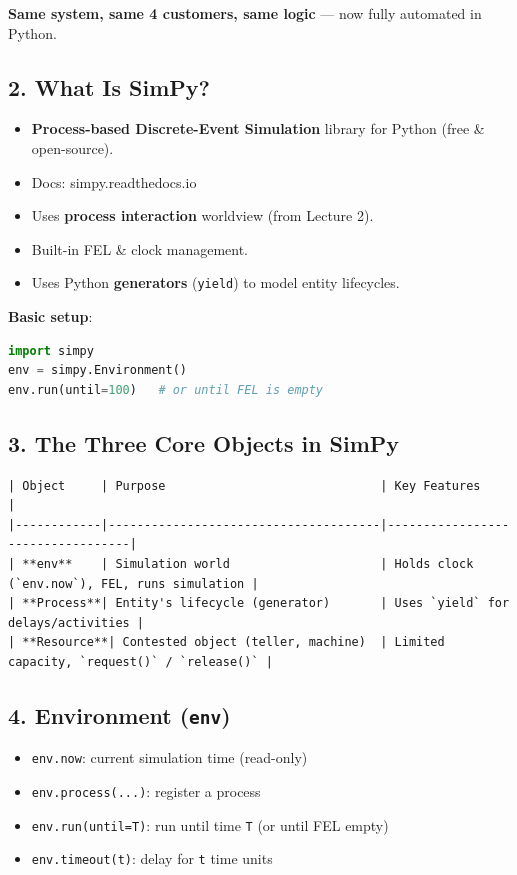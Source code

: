 \documentclass[11pt]{article}
\begin{document}
\textbf{Same system, same 4 customers, same logic} --- now fully automated in Python.

\subsection*{2. What Is SimPy?}
\begin{itemize}[leftmargin=*]
\item \textbf{Process-based Discrete-Event Simulation} library for Python (free \& open-source).  
\item Docs: simpy.readthedocs.io  
\item Uses \textbf{process interaction} worldview (from Lecture 2).  
\item Built-in FEL \& clock management.  
\item Uses Python \textbf{generators} (\texttt{yield}) to model entity lifecycles.  
\end{itemize}

\textbf{Basic setup}:
\begin{lstlisting}[language=Python]
import simpy
env = simpy.Environment()
env.run(until=100)   # or until FEL is empty
\end{lstlisting}

\subsection*{3. The Three Core Objects in SimPy}
\begin{verbatim}
| Object     | Purpose                              | Key Features                     |
|------------|--------------------------------------|----------------------------------|
| **env**    | Simulation world                     | Holds clock (`env.now`), FEL, runs simulation |
| **Process**| Entity's lifecycle (generator)       | Uses `yield` for delays/activities |
| **Resource**| Contested object (teller, machine)  | Limited capacity, `request()` / `release()` |
\end{verbatim}

\subsection*{4. Environment (\texttt{env})}
\begin{itemize}[leftmargin=*]
\item \texttt{env.now}: current simulation time (read-only)  
\item \texttt{env.process(...)}: register a process  
\item \texttt{env.run(until=T)}: run until time \texttt{T} (or until FEL empty)  
\item \texttt{env.timeout(t)}: delay for \texttt{t} time units  
\end{itemize}
\end{document}
